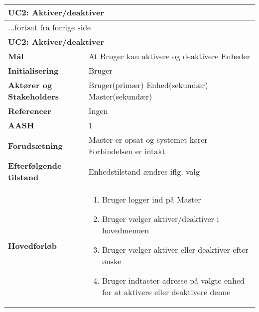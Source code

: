\begin{center} \centering \label{UC2} 
	\begin{longtable}{|p{5cm}|p{9cm}|}  %
	\hline
		\multicolumn{2}{|l|}{\textbf{UC2: Aktiver/deaktiver}} \\\hline %
		\endfirsthead
		
		\multicolumn{2}{l}{...fortsat fra forrige side} \\ \hline %
		\multicolumn{2}{|l|}{\textbf{UC2: Aktiver/deaktiver}} \\\hline %
		\endhead	
		
		\textbf{Mål}								&At Bruger kan aktivere og deaktivere Enheder	\\\hline
		\textbf{Initialisering}					&Bruger				\\\hline
		\textbf{Aktører og Stakeholders}			&Bruger(primær)		\newline 
												 Enhed(sekundær)		\newline 
												 Master(sekundær)	\\\hline
		\textbf{Referencer}						&Ingen				\\\hline
		\textbf{AASH}							&1					\\\hline
		\textbf{Forudsætning}					&Master er opsat og systemet kører \newline
												 Forbindelsen er intakt	\\\hline
		\textbf{Efterfølgende tilstand}			&Enhedstilstand ændres iflg. valg\\\hline
		\textbf{Hovedforløb}					
			&\begin{enumerate}
	
				\item Bruger logger ind på Master
				
				\item Bruger vælger aktiver/deaktiver i hovedmenuen
				
				\item Bruger vælger aktiver eller deaktiver efter ønske
				
				\item Bruger indtaster adresse på valgte enhed for at aktivere eller deaktivere denne	
	
			\end{enumerate}\\\hline
	\end{longtable}
\end{center}

